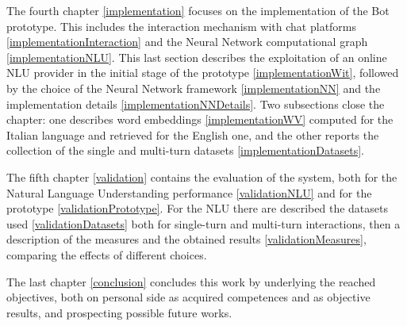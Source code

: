 The fourth chapter \ref{implementation} focuses on the implementation of the Bot prototype. This includes the interaction mechanism with chat platforms \ref{implementationInteraction} and the Neural Network computational graph \ref{implementationNLU}. This last section describes the exploitation of an online NLU provider in the initial stage of the prototype \ref{implementationWit}, followed by the choice of the Neural Network framework \ref{implementationNN} and the implementation details \ref{implementationNNDetails}. Two subsections close the chapter: one describes word embeddings \ref{implementationWV} computed for the Italian language and retrieved for the English one, and the other reports the collection of the single and multi-turn datasets \ref{implementationDatasets}.

The fifth chapter \ref{validation} contains the evaluation of the system, both for the Natural Language Understanding performance \ref{validationNLU} and for the prototype \ref{validationPrototype}. For the NLU there are described the datasets used \ref{validationDatasets} both for single-turn and multi-turn interactions, then a description of the measures and the obtained results \ref{validationMeasures}, comparing the effects of different choices.

The last chapter \ref{conclusion} concludes this work by underlying the reached objectives, both on personal side as acquired competences and as objective results, and prospecting possible future works.


